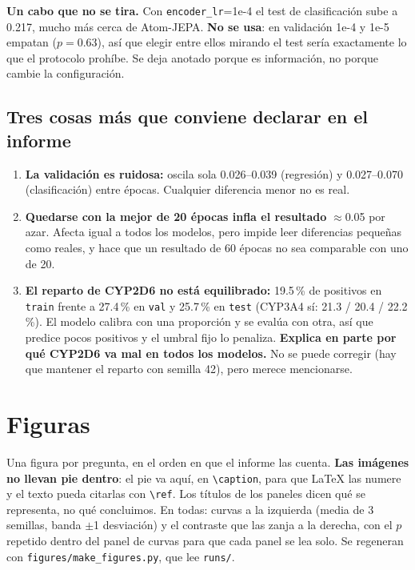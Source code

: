 \documentclass[11pt,a4paper]{article}
\newcommand{\var}[1]{\texttt{#1}}
\begin{document}
\noindent\textbf{Un cabo que no se tira.} Con \var{encoder\_lr}=1e-4 el test de clasificación sube a
0.217, mucho más cerca de Atom-JEPA. \textbf{No se usa}: en validación 1e-4 y 1e-5 empatan ($p=0.63$),
así que elegir entre ellos mirando el test sería exactamente lo que el protocolo prohíbe. Se deja
anotado porque es información, no porque cambie la configuración.

\subsection*{Tres cosas más que conviene declarar en el informe}
\begin{enumerate}
  \item \textbf{La validación es ruidosa:} oscila sola 0.026--0.039 (regresión) y 0.027--0.070
        (clasificación) entre épocas. Cualquier diferencia menor no es real.
  \item \textbf{Quedarse con la mejor de 20 épocas infla el resultado} $\approx$0.05 por azar. Afecta
        igual a todos los modelos, pero impide leer diferencias pequeñas como reales, y hace que un
        resultado de 60 épocas no sea comparable con uno de 20.
  \item \textbf{El reparto de CYP2D6 no está equilibrado:} 19.5\,\% de positivos en \var{train} frente
        a 27.4\,\% en \var{val} y 25.7\,\% en \var{test} (CYP3A4 sí: 21.3 / 20.4 / 22.2\,\%). El modelo
        calibra con una proporción y se evalúa con otra, así que predice pocos positivos y el umbral
        fijo lo penaliza. \textbf{Explica en parte por qué CYP2D6 va mal en todos los modelos.} No se
        puede corregir (hay que mantener el reparto con semilla 42), pero merece mencionarse.
\end{enumerate}

\newpage
\section{Figuras}

Una figura por pregunta, en el orden en que el informe las cuenta. \textbf{Las imágenes no llevan pie
dentro}: el pie va aquí, en \var{\textbackslash caption}, para que LaTeX las numere y el texto pueda
citarlas con \var{\textbackslash ref}. Los títulos de los paneles dicen qué se representa, no qué
concluimos. En todas: curvas a la izquierda (media de 3 semillas, banda $\pm$1 desviación) y el
contraste que las zanja a la derecha, con el $p$ repetido dentro del panel de curvas para que cada
panel se lea solo. Se regeneran con \var{figures/make\_figures.py}, que lee \var{runs/}.
\end{document}
